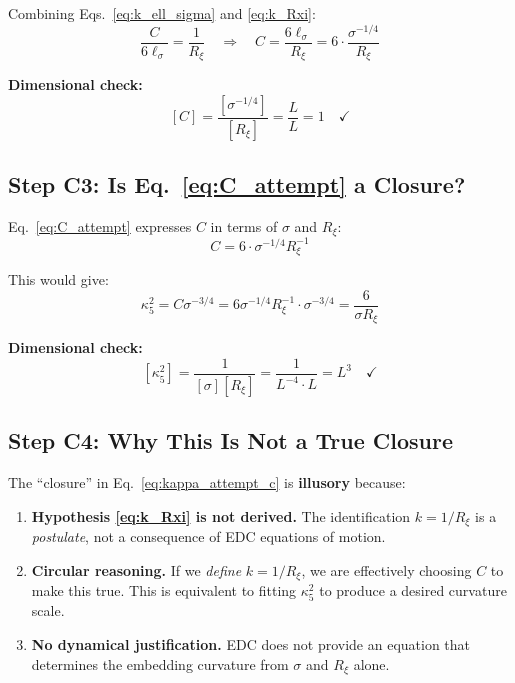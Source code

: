 \documentclass[11pt,a4paper]{article}
\theoremstyle{definition}
\begin{document}
Combining Eqs.~\eqref{eq:k_ell_sigma} and \eqref{eq:k_Rxi}:
\begin{equation}
\frac{C}{6 \ell_\sigma} = \frac{1}{R_\xi} \quad \Rightarrow \quad
C = \frac{6 \ell_\sigma}{R_\xi} = 6 \cdot \frac{\sigma^{-1/4}}{R_\xi}
\label{eq:C_attempt}
\end{equation}

\textbf{Dimensional check:}
\[
[C] = \frac{[\sigma^{-1/4}]}{[R_\xi]} = \frac{L}{L} = 1 \quad \checkmark
\]

\subsection{Step C3: Is Eq.~\eqref{eq:C_attempt} a Closure?}

Eq.~\eqref{eq:C_attempt} expresses $C$ in terms of $\sigma$ and $R_\xi$:
\begin{equation}
\boxed{C = 6 \cdot \sigma^{-1/4} R_\xi^{-1}}
\end{equation}

This would give:
\begin{equation}
\kappa_5^2 = C \sigma^{-3/4} = 6 \sigma^{-1/4} R_\xi^{-1} \cdot \sigma^{-3/4}
= \frac{6}{\sigma R_\xi}
\label{eq:kappa_attempt_c}
\end{equation}

\textbf{Dimensional check:}
\[
[\kappa_5^2] = \frac{1}{[\sigma][R_\xi]} = \frac{1}{L^{-4} \cdot L} = L^3 \quad \checkmark
\]

\subsection{Step C4: Why This Is Not a True Closure}

The ``closure'' in Eq.~\eqref{eq:kappa_attempt_c} is \textbf{illusory} because:

\begin{enumerate}
\item \textbf{Hypothesis \eqref{eq:k_Rxi} is not derived.} The identification
$k = 1/R_\xi$ is a \textit{postulate}, not a consequence of EDC equations of motion.

\item \textbf{Circular reasoning.} If we \textit{define} $k = 1/R_\xi$, we are
effectively choosing $C$ to make this true. This is equivalent to fitting $\kappa_5^2$
to produce a desired curvature scale.

\item \textbf{No dynamical justification.} EDC does not provide an equation that
determines the embedding curvature from $\sigma$ and $R_\xi$ alone.
\end{enumerate}
\end{document}
